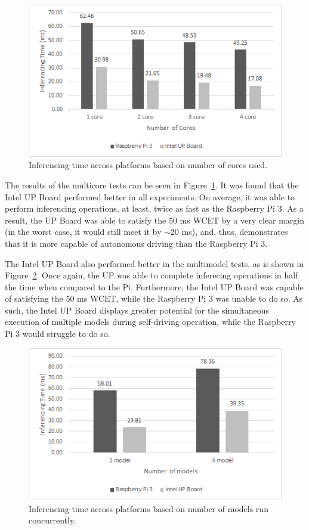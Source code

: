 \begin{figure}[h]
  \centering
  \includegraphics[width=.5\textwidth]{figs/system_multicore}
  \caption{Inferencing time across platforms based on number of cores used.}
  \label{fig:sys_core}
\end{figure}

The results of the multicore tests can be seen in Figure~\ref{fig:sys_core}. It was found that the 
Intel UP Board performed better in all experiments. On average, it was able to perform inferencing 
operations, at least, twice as fast as the Raspberry Pi 3. As a result, the UP Board was able to 
satisfy the 50 ms WCET by a very clear margin (in the worst case, it would still meet it by $\sim$20 
ms), and, thus, demonstrates that it is more capable of autonomous driving than the Raspberry Pi 3.

The Intel UP Board also performed better in the multimodel tests, as is shown in 
Figure~\ref{fig:sys_model}. Once again, the UP was able to complete inferecing operations in half the 
time when compared to the Pi. Furthermore, the Intel UP Board was capable of satisfying the 50 ms 
WCET, while the Raspberry Pi 3 was unable to do so. As such, the Intel UP Board displays greater 
potential for the simultaneous execution of multiple models during self-driving operation, while the 
Raspberry Pi 3 would struggle to do so.

\begin{figure}[h]
  \centering
  \includegraphics[width=.5\textwidth]{figs/system_multimodel}
  \caption{Inferencing time across platforms based on number of models run concurrently.}
  \label{fig:sys_model}
\end{figure}

